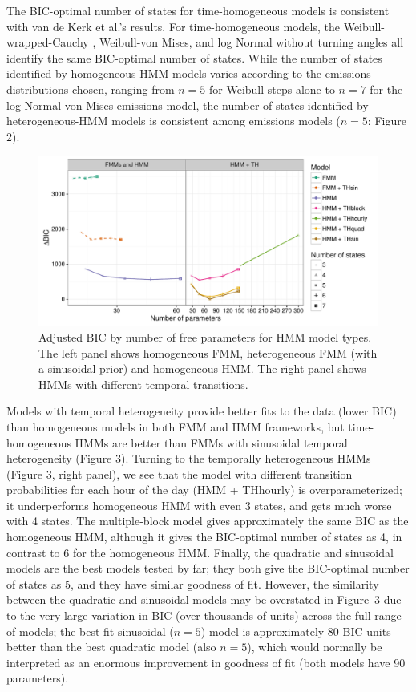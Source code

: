 \documentclass{bmcart}
\begin{document}
The BIC-optimal number of states for time-homogeneous models is
consistent with van de Kerk et al.'s \cite{kerk2015hidden}
results. For time-homogeneous models, the Weibull-wrapped-Cauchy
\cite{kerk2015hidden}, Weibull-von Mises, and log Normal without
turning angles all identify the same BIC-optimal number of
states. While the number of states identified
by homogeneous-HMM models varies according to the emissions
distributions chosen, ranging from $n=5$ for Weibull
steps alone to $n=7$ for the log Normal-von Mises emissions
model, the number of states identified
by heterogeneous-HMM models
is consistent among emissions models ($n=5$: Figure 2).

  \begin{figure}[h!]
   \includegraphics[width=5in]{figure/adj_BIC_comparisons-1}
  \caption{ Adjusted BIC by number of free parameters for HMM model types. The left panel shows homogeneous FMM, heterogeneous FMM (with a sinusoidal prior) and homogeneous HMM. The right panel shows HMMs with different temporal transitions.}
      \end{figure}
      

Models with temporal heterogeneity provide better fits to the data
(lower BIC) than homogeneous models in both FMM and HMM frameworks,
but time-homogeneous HMMs are better than FMMs with sinusoidal
temporal heterogeneity (Figure 3). Turning to the temporally
heterogeneous HMMs (Figure 3, right panel), we see that the model with
different transition probabilities for each hour of the day (HMM +
THhourly) is overparameterized; it underperforms homogeneous HMM with
even 3 states, and gets much worse with 4 states. The multiple-block
model gives approximately the same BIC as the homogeneous HMM,
although it gives the BIC-optimal number of states as 4, in contrast
to 6 for the homogeneous HMM.  Finally, the quadratic and sinusoidal
models are the best models tested by far; they both give the
BIC-optimal number of states as 5, and they have similar goodness of
fit.  However, the similarity between the quadratic 
and sinusoidal models may be overstated in Figure~3 due to the very large
variation in BIC (over thousands of units) across the full range of
models; the best-fit sinusoidal ($n=5$) model is approximately 80 BIC units
better than the best quadratic model (also $n=5$), which
would normally be interpreted as an enormous improvement in goodness of
fit (both models have 90 parameters).
\end{document}
